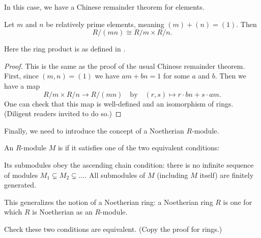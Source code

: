 In this case, we have a Chinese remainder theorem for elements.
\begin{theorem}
	Let $m$ and $n$ be relatively prime elements, meaning $(m) + (n) = (1)$.
	Then \[ R / (mn) \cong R/m \times R/n. \]
\end{theorem}
Here the ring product is as defined in .
\begin{proof}
	This is the same as the proof of the usual Chinese remainder theorem.
	First, since $(m,n)=(1)$ we have $am+bn=1$ for some $a$ and $b$.
	Then we have a map
	\[ R/m \times R/n \to R/(mn) \quad\text{by}\quad
		(r,s) \mapsto r \cdot bn + s \cdot am. \]
	One can check that this map is well-defined and an isomorphism of rings.
	(Diligent readers invited to do so.)
\end{proof}

Finally, we need to introduce the concept of a Noetherian $R$-module.
\begin{definition}
	An $R$-module $M$ is 
	if it satisfies one of the two equivalent conditions:
	\begin{itemize}
		\ii Its submodules obey the ascending chain condition:
		there is no infinite sequence of modules
		$M_1 \subsetneq M_2 \subsetneq \dots$.
		\ii All submodules of $M$ (including $M$ itself) are finitely generated.
	\end{itemize}
\end{definition}
This generalizes the notion of a Noetherian ring:
a Noetherian ring $R$ is one for which $R$ is Noetherian as an $R$-module.
\begin{ques}
	Check these two conditions are equivalent. (Copy the proof for rings.)
\end{ques}

